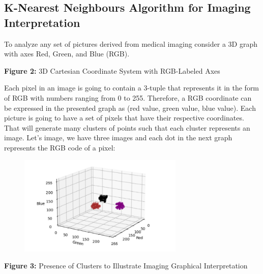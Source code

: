 \documentclass[12pt]{article}
\begin{document}
\subsection*{K-Nearest Neighbours Algorithm for Imaging Interpretation}
To analyze any set of pictures derived from medical imaging consider a 3D graph with axes Red, Green, and Blue (RGB).
\begin{center}
\end{center}
\begin{center}
    \textbf{Figure 2:} 3D Cartesian Coordinate System with RGB-Labeled Axes
\end{center}
Each pixel in an image is going to contain a 3-tuple that represents it in the form of RGB with numbers ranging from 0 to 255. Therefore, a RGB coordinate can be expressed in the
presented graph as (red value, green value, blue value). Each picture is going to have a set of pixels that have their respective coordinates. That will generate many clusters of points
such that each cluster represents an image. Let's image, we have three images and each dot in the next graph represents the RGB code of a pixel:

\begin{figure}[h]
    \centering
    \includegraphics[width=0.7\textwidth]{WhatsApp Image 2024-07-05 at 4.24.08 PM.jpeg}
\end{figure}
\begin{center}
    \textbf{Figure 3:} Presence of Clusters to Illustrate Imaging Graphical Interpretation
\end{center}
\end{document}

